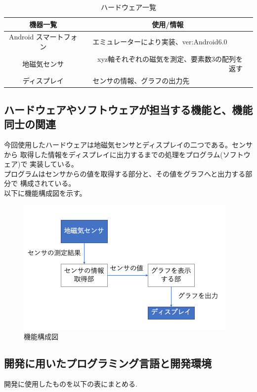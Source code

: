 \documentclass[dvipdfmx,autodetect-engine,titlepage]{jsarticle}
\begin{document}
 \begin{table}[h]
    \caption{ハードウェア一覧}
    \begin{tabular}{clll}
    \hline
    機器一覧            &  & \multicolumn{1}{c}{使用/情報}                  &  \\ \hline
    Android スマートフォン &  & エミュレーターにより実装、ver:Android6.0                               &  \\ \hline
    地磁気センサ          &  & \multicolumn{1}{r}{xyz軸それぞれの磁気を測定、要素数3の配列を返す} &  \\ \hline
    ディスプレイ          &  & センサの情報、グラフの出力先                             &  \\ \hline
    \end{tabular}
    \end{table}
 
 \subsection{ハードウェアやソフトウェアが担当する機能と、機能同士の関連}

 今回使用したハードウェアは地磁気センサとディスプレイの二つである。センサから
 取得した情報をディスプレイに出力するまでの処理をプログラム(ソフトウェア)で
 実装している。\\
 プログラムはセンサからの値を取得する部分と、その値をグラフへと出力する部分で
 構成されている。\\
 以下に機能構成図を示す。

\begin{figure}[h]
  \centering
  \includegraphics[scale=0.4]{機能構成図.png}
  \caption{機能構成図}
\end{figure}

 
 \subsection{開発に用いたプログラミング言語と開発環境}
 開発に使用したものを以下の表にまとめる.
\end{document}

